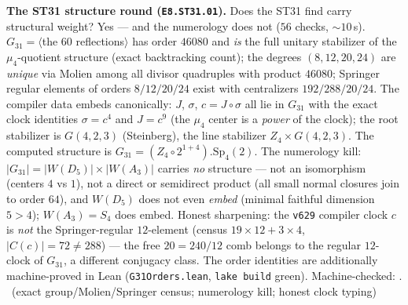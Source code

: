 \documentclass[11pt,a4paper]{article}
\theoremstyle{definition}
\begin{document}
\par\smallskip\noindent\textbf{The ST31 structure round
(\texttt{E8.ST31.01}).}
Does the ST31 find carry structural weight?  Yes --- and the
numerology does not ($56$ checks, ${\sim}10$\,s).  $G_{31}=\langle$the
$60$ reflections$\rangle$ has order $46080$ and \emph{is} the full
unitary stabilizer of the $\mu_4$-quotient structure (exact
backtracking count); the degrees $(8,12,20,24)$ are \emph{unique} via
Molien among all divisor quadruples with product $46080$; Springer
regular elements of orders $8/12/20/24$ exist with centralizers
$192/288/20/24$.  The compiler data embeds canonically: $J$, $\sigma$,
$c=J\circ\sigma$ all lie in $G_{31}$ with the exact clock identities
$\sigma=c^4$ and $J=c^9$ (the $\mu_4$ center is a \emph{power} of the
clock); the root stabilizer is $G(4,2,3)$ (Steinberg), the line
stabilizer $Z_4\times G(4,2,3)$.  The computed structure is
$G_{31}=(Z_4\circ2^{1+4}).\mathrm{Sp}_4(2)$.  The numerology kill:
$|G_{31}|=|W(D_5)|\times|W(A_3)|$ carries \emph{no} structure ---
not an isomorphism (centers $4$ vs $1$), not a direct or semidirect
product (all small normal closures join to order $64$), and $W(D_5)$
does not even \emph{embed} (minimal faithful dimension $5>4$);
$W(A_3)=S_4$ does embed.  Honest sharpening: the \texttt{v629}
compiler clock $c$ is \emph{not} the Springer-regular $12$-element
(census $19\times12+3\times4$, $|C(c)|=72\ne288$) --- the free
$20=240/12$ comb belongs to the regular $12$-clock of $G_{31}$, a
different conjugacy class.  The order identities are additionally
machine-proved in Lean (\texttt{G31Orders.lean}, \texttt{lake build}
green).
Machine-checked: .
\mE\ (exact group/Molien/Springer census; numerology kill; honest
clock typing)
\par\smallskip
\end{document}
